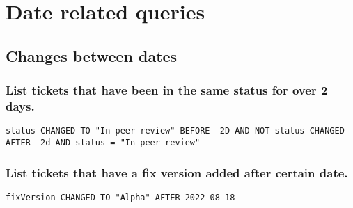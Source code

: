 \newpage
\chapter{Date related queries}

\section{Changes between dates}

\subsection*{List tickets that have been in the same status for over 2 days.}

\begin{small}
    \begin{lstlisting}[language=jql]
status CHANGED TO "In peer review" BEFORE -2D AND NOT status CHANGED AFTER -2d AND status = "In peer review"
\end{lstlisting}
\end{small}


\subsection*{List tickets that have a fix version added after certain date.}

\begin{small}
    \begin{lstlisting}[language=jql]
    fixVersion CHANGED TO "Alpha" AFTER 2022-08-18
    \end{lstlisting}
\end{small}
